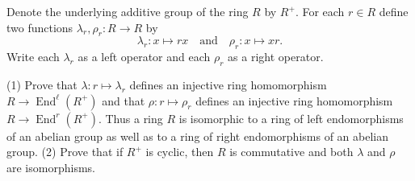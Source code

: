 Denote the underlying additive group of the ring $R$ by $R^+$. For each $r \in R$ define two functions $\lambda_r, \rho_r: R \to R$ by
$$\lambda_r: x \mapsto rx \quad \text{and} \quad \rho_r: x \mapsto xr.$$
Write each $\lambda_r$ as a left operator and each $\rho_r$ as a right operator.

(1) Prove that $\lambda: r \mapsto \lambda_r$ defines an injective ring homomorphism $R \to \operatorname{End}^\ell(R^+)$ and that $\rho: r \mapsto \rho_r$ defines an injective ring homomorphism $R \to \operatorname{End}^r(R^+)$. Thus a ring $R$ is isomorphic to a ring of left endomorphisms of an abelian group as well as to a ring of right endomorphisms of an abelian group.
(2) Prove that if $R^+$ is cyclic, then $R$ is commutative and both $\lambda$ and $\rho$ are isomorphisms.

